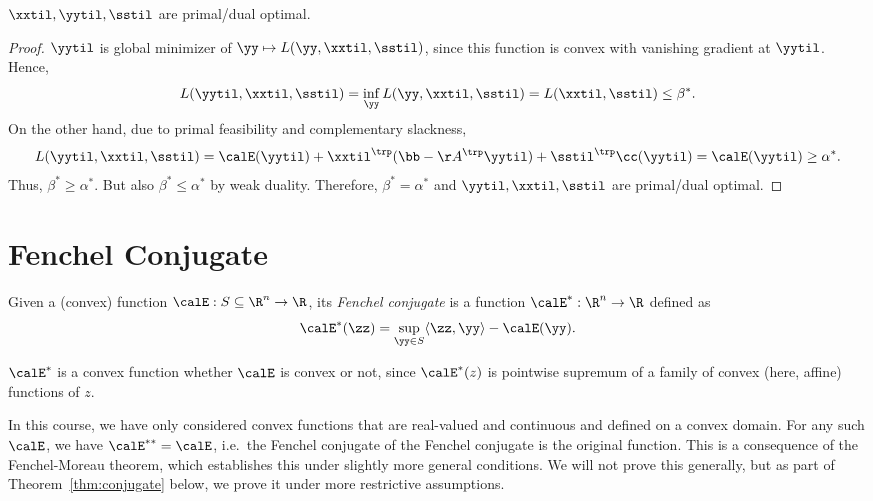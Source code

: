 \begin{theorem}
  $\xxtil, \yytil, \sstil$ are primal/dual optimal.
\end{theorem}
\begin{proof}
  $\yytil$ is global minimizer of $\yy \mapsto L(\yy, \xxtil, \sstil)$, since this function is convex with vanishing gradient at $\yytil$. Hence,
  \[ L(\yytil, \xxtil, \sstil) = \inf_{\yy} L(\yy, \xxtil, \sstil) = L(\xxtil,\sstil) \leq \beta^*. \]
  On the other hand, due to primal feasibility and complementary slackness,
  \[ L(\yytil,\xxtil,\sstil) = \calE(\yytil) + \xxtil^\trp(\bb-\AA^\trp\yytil) + \sstil^\trp\cc(\yytil) = \calE(\yytil) \geq \alpha^*. \]
  Thus, $\beta^*\geq\alpha^*$. But also $\beta^*\leq\alpha^*$ by weak duality. Therefore, $\beta^*=\alpha^*$ and $\yytil,\xxtil,\sstil$ are primal/dual optimal.
\end{proof}


\section{Fenchel Conjugate}
\begin{definition}
  Given a (convex) function $\calE:S\subseteq\R^n\to\R$, its \emph{Fenchel conjugate} is a function $\calE^*:\R^n\to\R$ defined as
  \[ \calE^*(\zz) = \sup_{\yy\in S} \langle \zz,\yy \rangle - \calE(\yy). \]
\end{definition}

\begin{remark}
  $\calE^*$ is a convex function whether $\calE$ is convex or not, since $\calE^*(z)$ is pointwise supremum of a family of convex (here, affine) functions of $z$.
\end{remark}

In this course, we have only considered convex functions that are
real-valued and continuous and defined on a convex domain. For any such $\calE$, we have $\calE^{**} = \calE$,
i.e.\ the Fenchel conjugate of the Fenchel conjugate is the original
function.
This is a consequence of the Fenchel-Moreau
theorem, which establishes this under slightly more general conditions.
We will not prove this generally, but as part of
Theorem~\ref{thm:conjugate} below, we prove it under more restrictive assumptions.

